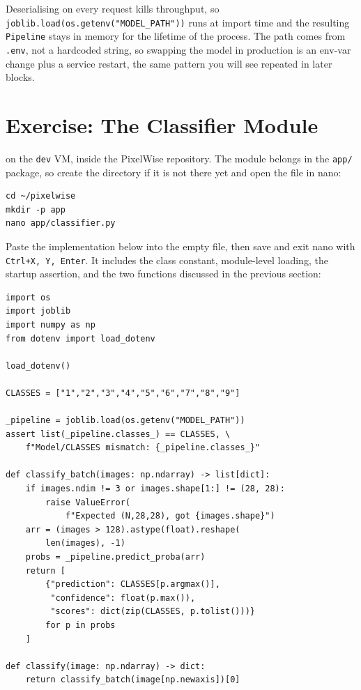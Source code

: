 Deserialising on every request kills throughput, so
\texttt{joblib.load(os.getenv("MODEL\_PATH"))} runs at import time and
the resulting \texttt{Pipeline} stays in memory for the lifetime of the
process. The path comes from \texttt{.env}, not a hardcoded string, so
swapping the model in production is an env-var change plus a service
restart, the same pattern you will see repeated in later blocks.




\newpage
\section{Exercise: The Classifier Module}

 on the \texttt{dev} VM,
inside the PixelWise repository. The module belongs in the \texttt{app/}
package, so create the directory if it is not there yet and open the file
in nano:

\begin{verbatim}
cd ~/pixelwise
mkdir -p app
nano app/classifier.py
\end{verbatim}

Paste the implementation below into the empty file, then save and exit nano with
\texttt{Ctrl+X, Y, Enter}. It includes the class
constant, module-level loading, the startup assertion, and the two
functions discussed in the previous section:

\begin{verbatim}
import os
import joblib
import numpy as np
from dotenv import load_dotenv

load_dotenv()

CLASSES = ["1","2","3","4","5","6","7","8","9"]

_pipeline = joblib.load(os.getenv("MODEL_PATH"))
assert list(_pipeline.classes_) == CLASSES, \
    f"Model/CLASSES mismatch: {_pipeline.classes_}"

def classify_batch(images: np.ndarray) -> list[dict]:
    if images.ndim != 3 or images.shape[1:] != (28, 28):
        raise ValueError(
            f"Expected (N,28,28), got {images.shape}")
    arr = (images > 128).astype(float).reshape(
        len(images), -1)
    probs = _pipeline.predict_proba(arr)
    return [
        {"prediction": CLASSES[p.argmax()],
         "confidence": float(p.max()),
         "scores": dict(zip(CLASSES, p.tolist()))}
        for p in probs
    ]

def classify(image: np.ndarray) -> dict:
    return classify_batch(image[np.newaxis])[0]
\end{verbatim}

